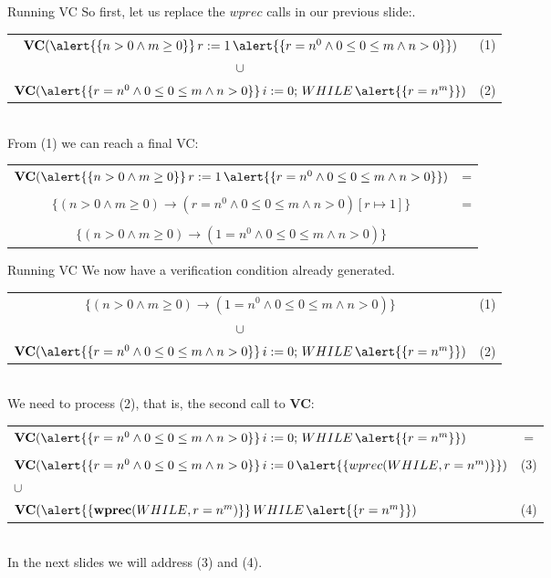 \documentclass[aspectratio=169]{beamer}
\begin{document}
\begin{slide}{Running VC}
So first, let us replace the $wprec$ calls in our previous slide:.\\\vspace{0.5cm}
\small{
\begin{tabular}{cc}
  $\textbf{VC}(\alert{\{n > 0 \land m \geq 0\}}\,r := 1\,\alert{\{r = n^0 \land 0 \leq 0 \leq m \land n > 0\}})$ & (1)\\
  $\cup$\\
  $\textbf{VC}(\alert{\{r = n^0 \land 0 \leq 0 \leq m \land n > 0\}}\,i := 0;\,WHILE\,\alert{\{r = n^m\}})$ & (2)
\end{tabular}}\\\vspace{0.5cm}  
From (1) we can reach a final VC:\\\vspace{0.5cm}
\small{
\begin{tabular}{cc}
  $\textbf{VC}(\alert{\{n > 0 \land m \geq 0\}}\,r := 1\,\alert{\{r = n^0 \land 0 \leq 0 \leq m \land n > 0\}})$ & =\\
  &\\
  $\{(n > 0 \land m \geq 0) \to (r = n^0 \land 0 \leq 0 \leq m \land n > 0)[r \mapsto 1]\}$ & =\\
  &\\
  $\{(n > 0 \land m \geq 0) \to (1 = n^0 \land 0 \leq 0 \leq m \land n > 0)\}$
\end{tabular}}
\end{slide}

\begin{slide}{Running VC}
We now have a verification condition already generated.\\\vspace{0.5cm}
\small{
\begin{tabular}{cc}
  $\{(n > 0 \land m \geq 0) \to (1 = n^0 \land 0 \leq 0 \leq m \land n > 0)\}$ & (1)\\
  $\cup$\\
  $\textbf{VC}(\alert{\{r = n^0 \land 0 \leq 0 \leq m \land n > 0\}}\,i := 0;\,WHILE\,\alert{\{r = n^m\}})$ & (2)
\end{tabular}}\\\vspace{0.5cm}  
We need to process (2), that is, the second call to \textbf{VC}:\\\vspace{0.5cm}
\small{
\begin{tabular}{lc}
  $\textbf{VC}(\alert{\{r = n^0 \land 0 \leq 0 \leq m \land n > 0\}}\,i := 0;\,WHILE\,\alert{\{r = n^m\}})$ & =\\
  &\\
  $\textbf{VC}(\alert{\{r = n^0 \land 0 \leq 0 \leq m \land n > 0\}}\,i := 0\,\alert{\{wprec(WHILE,r = n^m)\}})$ & (3)\\
 $\cup$\\
  $\textbf{VC}(\alert{\{\textbf{wprec}(WHILE,r = n^m)\}}\,WHILE\,\alert{\{r = n^m\}})$ & (4)
\end{tabular}}\\\vspace{0.3cm}
In the next slides we will address (3) and (4).
\end{slide}
\end{document}
